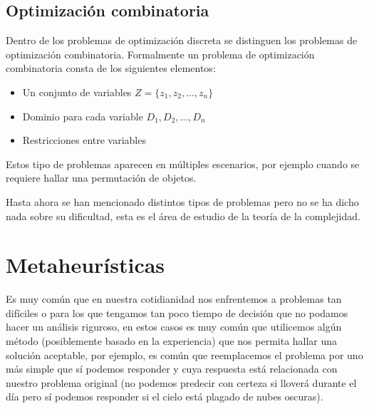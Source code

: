 \subsection*{Optimización combinatoria}
Dentro de los problemas de optimización discreta se distinguen los problemas de optimización combinatoria. Formalmente un problema de optimización combinatoria consta de los siguientes elementos\cite{Blum2003}:
\begin{itemize}
    \item Un conjunto de variables $Z=\{z_1,z_2,...,z_n\}$
    \item Dominio para cada variable $D_1,D_2,...,D_n$
    \item Restricciones entre variables
\end{itemize}

Estos tipo de problemas aparecen en múltiples escenarios, por ejemplo cuando se requiere hallar una permutación de objetos.

Hasta ahora se han mencionado distintos tipos de problemas pero no se ha dicho nada sobre su dificultad, esta es el área de estudio de la teoría de la complejidad.




\section{Metaheurísticas}
Es muy común que en nuestra cotidianidad nos enfrentemos a problemas tan difíciles o para los que tengamos tan poco tiempo de decisión que no podamos hacer un análisis riguroso, en estos casos es muy común que utilicemos algún método (posiblemente basado en la experiencia) que nos permita hallar una solución aceptable, por ejemplo, es común que reemplacemos el problema por uno más simple que sí podemos responder y cuya respuesta está relacionada con nuestro problema original (no podemos predecir con certeza si lloverá durante el día pero sí podemos responder si el cielo está plagado de nubes oscuras).

